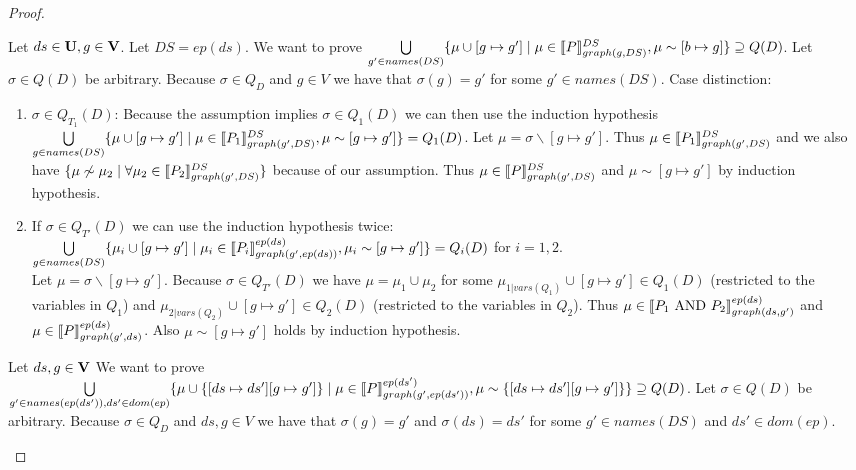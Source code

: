 \begin{proof}
\begin{enumerate}
	\bigskip\noindent
	Let $ds \in \mathbf{U}, g \in \mathbf{V}$. Let $DS = ep(ds)$.
	We want to prove  
	$\bigcup\limits_{g' \in names(DS)} \{ \mu \cup [g \mapsto g'] \mid \mu
	\in \llbracket P \rrbracket^{DS}_{graph(g,DS)}, \mu \sim [b\mapsto g] \}  \supseteq Q(D) $.
	Let $\sigma \in Q(D)$ be arbitrary.
	Because $\sigma \in Q_{D}$ and $g \in V$ we have that $\sigma(g) =
	g'$ for some $g' \in names(DS)$.
	Case distinction:
	\begin{enumerate}
		\item $\sigma \in Q_{T_1}(D)$:  Because the assumption implies $\sigma
			\in Q_1(D)$	we can then use the induction hypothesis  
			$\bigcup\limits_{g \in names(DS)} \{ \mu \cup [g \mapsto g'] \mid \mu
			\in \llbracket P_1 \rrbracket^{DS}_{graph(g',DS)}, \mu \sim [g\mapsto g'] \}  =
			Q_1(D) $. Let $\mu = \sigma \backslash [g \mapsto g']$. 
			Thus $\mu \in \llbracket P_1 \rrbracket^{DS}_{graph(g',DS)}$ 
			and we also have $\{\mu \not\sim \mu_2 \mid \forall \mu_2 \in
			\llbracket P_2 \rrbracket^{DS}_{graph(g',DS)} \}$ because of our assumption.
			Thus $\mu \in \llbracket P \rrbracket_{graph(g',DS)}^{DS}$ and $\mu \sim [g
			\mapsto g']$ by induction hypothesis.
		\item If $\sigma \in Q_{T'}(D)$  we can use the induction hypothesis twice:\\
			$\bigcup\limits_{g \in names(DS)} \{ \mu_i \cup [g \mapsto g'] \mid \mu_i
			\in \llbracket P_i \rrbracket^{ep(ds)}_{graph(g',ep(ds))}, \mu_i \sim [g\mapsto g'] \}  =
			Q_i(D)$ for $i=1,2$.\\
			Let $\mu = \sigma \backslash [g \mapsto g']$.
			Because $\sigma \in Q_{T'}(D)$ we have $\mu = \mu_1 \cup \mu_2$ for
			some $\mu_{1|vars(Q_1)}\cup[g \mapsto g'] \in Q_1(D)$ (restricted to
			the variables in $Q_1$) and $\mu_{2|vars(Q_2)}\cup [g \mapsto g'] \in Q_2(D)$ (restricted to
			the variables in $Q_2$).
			Thus $\mu \in \llbracket P_1 \mbox{ AND } P_2 \rrbracket^{ep(ds)}_{graph(ds,g')}$
			and $\mu \in \llbracket P \rrbracket^{ep(ds)}_{graph(g',ds)}$. Also $\mu \sim [g \mapsto
			g']$ holds by induction	hypothesis.
	\end{enumerate}

	\bigskip\noindent
	Let $ds,g \in \mathbf{V}$ We want to prove  
	$\bigcup\limits_{g' \in names(ep(ds')), ds' \in dom(ep)} 
	\{ \mu \cup \{[ds \mapsto ds'] [g \mapsto g']\} \mid \mu
		\in \llbracket P \rrbracket^{ep(ds')}_{graph(g',ep(ds'))}, \mu \sim \{[ds \mapsto ds'] [g
	\mapsto g']\} \}  \supseteq Q(D) $.
	Let $\sigma \in Q(D)$ be arbitrary.
	Because $\sigma \in Q_{D}$ and $ds,g \in V$ we have that $\sigma(g) =
	g'$ and $\sigma(ds) = ds'$ for some $g' \in names(DS)$ and $ds' \in dom(ep)$.


\end{enumerate}
\end{proof}
